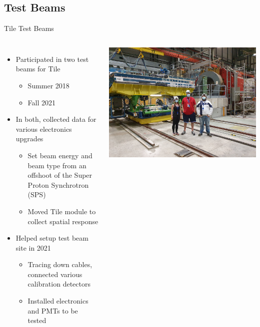 \documentclass[aspectratio=169,xcolor=table]{beamer}
\begin{document}
  \subsection{Test Beams}
    \begin{frame}[t]{Tile Test Beams}
      \begin{columns}
      \begin{itemize}
        \item Participated in two test beams for Tile
        \begin{itemize}
          \vspace{-.185cm}
          \item Summer 2018
          \item Fall 2021
        \end{itemize}
        \item In both, collected data for various electronics upgrades
        \begin{itemize}
          \item Set beam energy and beam type from an offshoot of the Super Proton Synchrotron (SPS)
          \item Moved Tile module to collect spatial response
        \end{itemize}
        \item Helped setup test beam site in 2021
        \begin{itemize}
          \item Tracing down cables, connected various calibration detectors
          \item Installed electronics and PMTs to be tested
        \end{itemize}
      \end{itemize}
        \includegraphics[width=.9\textwidth,keepaspectratio=true]{TileTestBeamSetup_Michaela_Will_Me.jpg}

\end{columns}
\end{frame}
\end{document}
